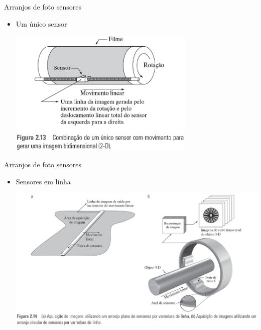    \begin{slide}[toc=]{Arranjos de foto sensores}
      \begin{itemize}[type=1]
         \item Um único sensor
            \begin{center}
               \includegraphics[width=0.7\textwidth]{figs/fig0213}
            \end{center}
      \end{itemize}
   \end{slide}
   
   \begin{slide}[toc=]{Arranjos de foto sensores}
      \begin{itemize}[type=1]
         \item Sensores em linha
            \begin{center}
               \includegraphics[width=.9\textwidth]{figs/fig0214}
            \end{center}
      \end{itemize}
   \end{slide}
   
